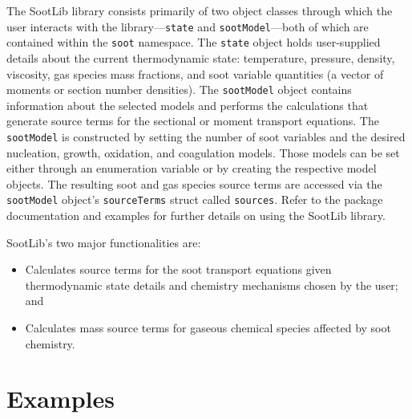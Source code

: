 \documentclass[preprint,letterpaper]{elsarticle}
\begin{document}
The SootLib library consists primarily of two object classes through which the user interacts with the library---\texttt{state} and \texttt{sootModel}---both of which are contained within the \texttt{soot} namespace. The \texttt{state} object holds user-supplied details about the current thermodynamic state: temperature, pressure, density, viscosity, gas species mass fractions, and soot variable quantities (a vector of moments or section number densities). The \texttt{sootModel} object contains information about the selected models and performs the calculations that generate source terms for the sectional or moment transport equations. The \texttt{sootModel} is constructed by setting the number of soot variables and the desired nucleation, growth, oxidation, and coagulation models. Those models can be set either through an enumeration variable or by creating the respective model objects.
The resulting soot and gas species source terms are accessed via the \texttt{sootModel} object's \texttt{sourceTerms} struct called \texttt{sources}. Refer to the package documentation and examples for further details on using the SootLib library.

SootLib's two major functionalities are:
\begin{itemize}
    \item Calculates source terms for the soot transport equations given thermodynamic state details and chemistry mechanisms chosen by the user; and
    \item Calculates mass source terms for gaseous chemical species affected by soot chemistry.
\end{itemize}


\section{Examples}
\label{s:examples}


\end{document}
